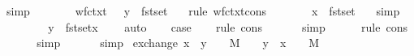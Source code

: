 \begin{isabellebody}
\ simp{\isacharplus}\isanewline
\ \ \isamarkupfalse%
\ {}{\isacharparenleft}{}{\isacharparenright}\ \isamarkupfalse%
\ {}{\isacharcolon}\ {\isachardoublequoteopen}wf{\isacharunderscore}ctxt\ {\isasymGamma}\ {\isasymand}\ y\ {\isasymnotin}\ fst{\isacharbackquote}set\ {\isasymGamma}{\isachardoublequoteclose}\ \isamarkupfalse%
\ {\isacharparenleft}rule\ wf{\isacharunderscore}ctxt{\isacharunderscore}cons{\isacharparenright}\isanewline
\ \ \isamarkupfalse%
\ {}{\isacharparenleft}{}{\isacharparenright}\ \isamarkupfalse%
\ {}{\isacharcolon}\ {\isachardoublequoteopen}x\ {\isasymnotin}\ fst{\isacharbackquote}set\ {\isasymGamma}{\isachardoublequoteclose}\ \isamarkupfalse%
\ simp\isanewline
\ \ \isamarkupfalse%
\ {}{\isacharparenleft}{}{\isacharparenright}\ {}\ \isamarkupfalse%
\ {}{\isacharcolon}\ {\isachardoublequoteopen}y\ {\isasymnotin}\ fst{\isacharbackquote}set{\isacharparenleft}{\isacharparenleft}x{\isacharcomma}{\isasymsigma}{\isacharparenright}\ {\isacharhash}\ {\isasymGamma}{\isacharparenright}{\isachardoublequoteclose}\ \isamarkupfalse%
\ auto\isanewline
\isanewline
\ \ \isamarkupfalse%
\ {\isacharquery}case\isanewline
\ \ \isamarkupfalse%
\ {\isacharparenleft}rule\ cons{\isacharparenright}\isanewline
\ \ \isamarkupfalse%
\ {}\ \isamarkupfalse%
\ simp\ \ \isanewline
\ \ \isamarkupfalse%
\ {\isacharparenleft}rule\ cons{\isacharparenright}\isanewline
\ \ \isamarkupfalse%
\ {}\ \isamarkupfalse%
\ simp\isanewline
\ \ \isamarkupfalse%
\ {}\ \isamarkupfalse%
\ simp\isanewline
{}\isamarkupfalse%
%
\endisatagproof
{\isafoldproof}%
%
\isadelimproof
\isanewline
%
\endisadelimproof
\isanewline
{}\isamarkupfalse%
\ exchange{\isacharcolon}\ {\isachardoublequoteopen}{\isacharparenleft}x{\isacharcomma}{\isasymsigma}{\isacharparenright}\ {\isacharhash}\ {\isacharparenleft}y{\isacharcomma}{\isasympi}{\isacharparenright}\ {\isacharhash}\ {\isasymGamma}\ {\isasymturnstile}\ M\ {\isacharcolon}\ {\isasymdelta}\ {\isasymLongrightarrow}\ {\isacharparenleft}y{\isacharcomma}{\isasympi}{\isacharparenright}\ {\isacharhash}\ {\isacharparenleft}x{\isacharcomma}{\isasymsigma}{\isacharparenright}\ {\isacharhash}\ {\isasymGamma}\ {\isasymturnstile}\ M\ {\isacharcolon}\ {\isasymdelta}{\isachardoublequoteclose}\isanewline

\end{isabellebody}
